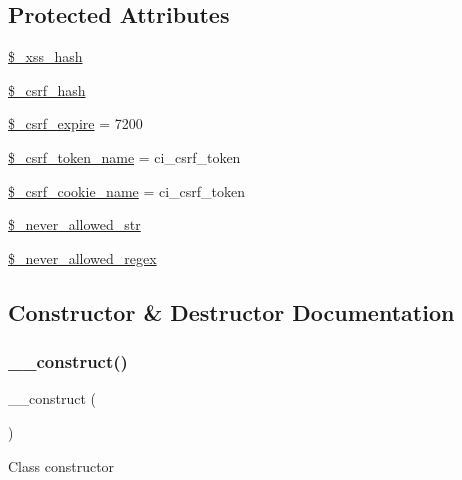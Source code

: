 \subsection*{Protected Attributes}
\begin{DoxyCompactItemize}
\item 
\mbox{\hyperlink{class_c_i___security_aca426a0e87199bfa36c7401a1d06a419}{\$\+\_\+xss\+\_\+hash}}
\item 
\mbox{\hyperlink{class_c_i___security_a8bf24cc529f04164ac20d892ce20d721}{\$\+\_\+csrf\+\_\+hash}}
\item 
\mbox{\hyperlink{class_c_i___security_af86a83f20de2a3c522bf690d4080c08e}{\$\+\_\+csrf\+\_\+expire}} = 7200
\item 
\mbox{\hyperlink{class_c_i___security_a6752ebca4be235c079785a87a693d932}{\$\+\_\+csrf\+\_\+token\+\_\+name}} = \textquotesingle{}ci\+\_\+csrf\+\_\+token\textquotesingle{}
\item 
\mbox{\hyperlink{class_c_i___security_a52043f2c9ffb0e14eade8e67a0172a82}{\$\+\_\+csrf\+\_\+cookie\+\_\+name}} = \textquotesingle{}ci\+\_\+csrf\+\_\+token\textquotesingle{}
\item 
\mbox{\hyperlink{class_c_i___security_ab883fab930a1c4a926eaa501ab211823}{\$\+\_\+never\+\_\+allowed\+\_\+str}}
\item 
\mbox{\hyperlink{class_c_i___security_ac502ee17d09eb8bbd70a6fb1f9515503}{\$\+\_\+never\+\_\+allowed\+\_\+regex}}
\end{DoxyCompactItemize}


\subsection{Constructor \& Destructor Documentation}
\mbox{\label{class_c_i___security_a095c5d389db211932136b53f25f39685}} 
\subsubsection{\texorpdfstring{\+\_\+\+\_\+construct()}{\_\_construct()}}
{\footnotesize\ttfamily \+\_\+\+\_\+construct (\begin{DoxyParamCaption}{ }\end{DoxyParamCaption})}

Class constructor

